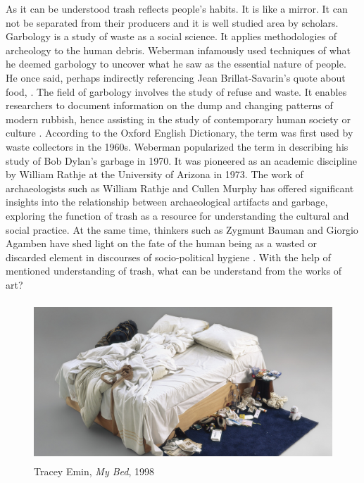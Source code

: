 As it can be understood trash reflects people's habits. It is like a mirror. It can not be separated from their producers and it is well studied area by scholars. Garbology is a study of waste as a social science. It applies methodologies of archeology to the human debris. Weberman infamously used techniques of what he deemed garbology to uncover what he saw as the essential nature of people. He once said, perhaps indirectly referencing Jean Brillat-Savarin’s quote about food,  \citep[as cited in][301]{lukas2012garbage}. The field of garbology involves the study of refuse and waste. It enables researchers to document information on the dump and changing patterns of modern rubbish, hence assisting in the study of contemporary human society or culture \citep{roy2012garbology}. According to the Oxford English Dictionary, the term was first used by waste collectors in the 1960s. Weberman popularized the term in describing his study of Bob Dylan’s garbage in 1970. It was pioneered as an academic discipline by William Rathje at the University of Arizona in 1973. The work of archaeologists such as William Rathje and Cullen Murphy has offered significant insights into the relationship between archaeological artifacts and garbage, exploring the function of trash as a resource for understanding the cultural and social practice. At the same time, thinkers such as Zygmunt Bauman and Giorgio Agamben have shed light on the fate of the human being as a wasted or discarded element in discourses of socio-political hygiene \citep{pye2010trashculture}. With the help of mentioned understanding of trash, what can be understand from the works of art?

\begin{figure}[h!]
  \centering
  \includegraphics[height=6cm]{graphics/tracey-emin-my-bed.jpg}
  \caption{Tracey Emin, \textit{My Bed}, 1998}
  \label{fig:TraceyEmin_MyBed}
\end{figure}

